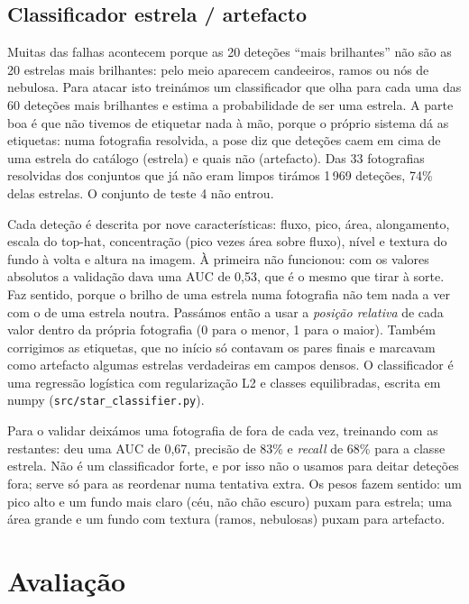 \documentclass[11pt,a4paper]{article}
\begin{document}
\subsection{Classificador estrela / artefacto}
\label{sec:classificador}

Muitas das falhas acontecem porque as 20 deteções ``mais brilhantes'' não
são as 20 estrelas mais brilhantes: pelo meio aparecem candeeiros, ramos ou
nós de nebulosa. Para atacar isto treinámos um classificador que olha para
cada uma das 60 deteções mais brilhantes e estima a probabilidade de ser uma
estrela. A parte boa é que não tivemos de etiquetar nada à mão, porque o
próprio sistema dá as etiquetas: numa fotografia resolvida, a pose diz que
deteções caem em cima de uma estrela do catálogo (estrela) e quais não
(artefacto).
Das 33 fotografias resolvidas dos conjuntos que já não eram limpos tirámos
1\,969 deteções, 74\% delas estrelas. O conjunto de teste 4 não entrou.

Cada deteção é descrita por nove características: fluxo, pico, área,
alongamento, escala do top-hat, concentração (pico vezes área sobre fluxo),
nível e textura do fundo à volta e altura na imagem. À primeira não
funcionou: com os valores absolutos a validação dava uma AUC de 0,53, que é
o mesmo que tirar à sorte. Faz sentido, porque o brilho de uma estrela numa
fotografia não tem nada a ver com o de uma estrela noutra. Passámos então a
usar a \emph{posição relativa} de cada valor dentro da própria fotografia (0
para o menor, 1 para o maior). Também corrigimos as etiquetas, que no início
só contavam os pares finais e marcavam como artefacto algumas estrelas
verdadeiras em campos densos. O classificador é uma regressão logística com
regularização L2 e classes equilibradas, escrita em numpy
(\texttt{src/star\_classifier.py}).

Para o validar deixámos uma fotografia de fora de cada vez, treinando com as
restantes: deu uma AUC de 0,67, precisão de 83\% e \emph{recall} de 68\%
para a classe estrela. Não é um classificador forte, e por isso não o usamos
para deitar deteções fora; serve só para as reordenar numa tentativa extra. Os pesos fazem sentido: um pico alto
e um fundo mais claro (céu, não chão escuro) puxam para estrela; uma área
grande e um fundo com textura (ramos, nebulosas) puxam para artefacto.

\section{Avaliação}
\end{document}
